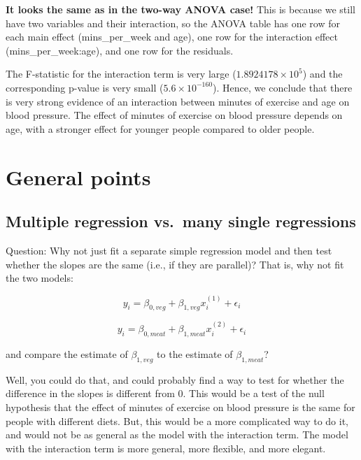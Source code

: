 \documentclass[
  letterpaper,
  8pt,
  a4paper]{book}
\begin{document}
\textbf{It looks the same as in the two-way ANOVA case!} This is because
we still have two variables and their interaction, so the ANOVA table
has one row for each main effect (mins\_per\_week and age), one row for
the interaction effect (mins\_per\_week:age), and one row for the
residuals.

The F-statistic for the interaction term is very large
(\ensuremath{1.8924178\times 10^{5}}) and the corresponding p-value is
very small (\ensuremath{5.6\times 10^{-160}}). Hence, we conclude that
there is very strong evidence of an interaction between minutes of
exercise and age on blood pressure. The effect of minutes of exercise on
blood pressure depends on age, with a stronger effect for younger people
compared to older people.

\section*{General points}\label{general-points}


\subsection*{Multiple regression vs.~many single
regressions}\label{multiple-regression-vs.-many-single-regressions}

Question: Why not just fit a separate simple regression model and then
test whether the slopes are the same (i.e., if they are parallel)? That
is, why not fit the two models:

\[y_i = \beta_{0,veg} + \beta_{1,veg} x_i^{(1)} + \epsilon_i\]

\[y_i = \beta_{0,meat} + \beta_{1,meat} x_i^{(2)} + \epsilon_i\]

and compare the estimate of \(\beta_{1,veg}\) to the estimate of
\(\beta_{1,meat}\)?

Well, you could do that, and could probably find a way to test for
whether the difference in the slopes is different from 0. This would be
a test of the null hypothesis that the effect of minutes of exercise on
blood pressure is the same for people with different diets. But, this
would be a more complicated way to do it, and would not be as general as
the model with the interaction term. The model with the interaction term
is more general, more flexible, and more elegant.
\end{document}
